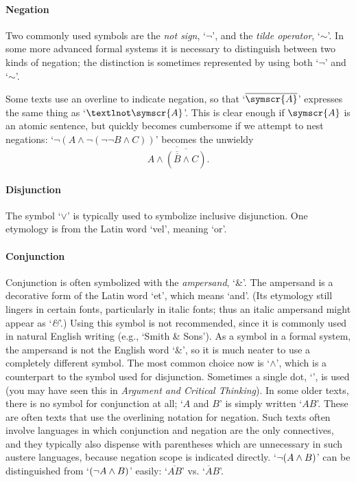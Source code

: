 \paragraph{Negation} Two commonly used symbols are the \emph{not sign}, `$¬$', and the \emph{tilde operator}, `$∼$'. In some more advanced formal systems it is necessary to distinguish between two kinds of negation; the distinction is sometimes represented by using both `$¬$' and `$∼$'.

Some texts use an overline to indicate negation, so that `$\overline{\symscr{A}}$' expresses the same thing as `$¬\symscr{A}$'. This is clear enough if $\symscr{A}$ is an atomic sentence, but quickly becomes cumbersome if we attempt to nest negations: `$¬(A \wedge ¬(¬¬B \wedge C))$' becomes the unwieldy $$\overline{A \wedge \overline{(\overline{\overline{B}}\wedge C)}}.$$

\paragraph{Disjunction} The symbol `$\vee$' is typically used to symbolize inclusive disjunction. One etymology is from the Latin word `vel', meaning `or'.%

\paragraph{Conjunction}
Conjunction is often symbolized with the \emph{ampersand}, `{\&}'. The ampersand is a decorative form of the Latin word `et', which means `and'.  (Its etymology still lingers in certain fonts, particularly in italic fonts; thus an italic ampersand might appear as `\emph{\&}'.) Using this symbol is not recommended, since it is commonly used in natural English writing (e.g., `Smith \& Sons'). As a symbol in a formal system, the ampersand is not the English word `\&', so it is much neater to use a completely different symbol. The most common choice now is `$\wedge$', which is a counterpart to the symbol used for disjunction. Sometimes a single dot, `{\scriptsize\textbullet}', is used (you may have seen this in \emph{Argument and Critical Thinking}). In some older texts, there is no symbol for conjunction at all; `$A$ and $B$' is simply written `$AB$'. These are often texts that use the overlining notation for negation. Such texts often involve languages in which conjunction and negation are the only connectives, and they typically also dispense with parentheses which are unnecessary in such austere languages, because negation scope is indicated directly.  `$\neg(A\wedge B)$' can be distinguished from `$(\neg A \wedge B)$' easily: `$\overline{AB}$' vs. `$\overline{A}B$'.

